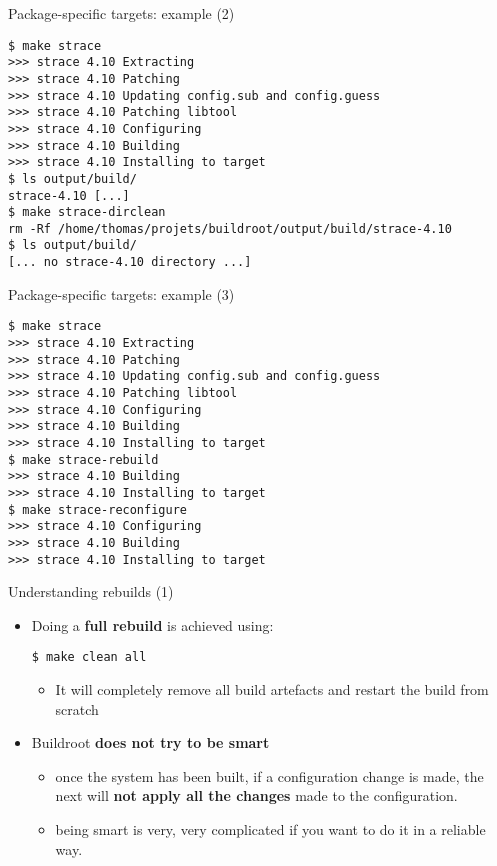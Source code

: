 \begin{frame}[fragile]{Package-specific targets: example (2)}

\begin{block}{}
{\tiny
\begin{verbatim}
$ make strace
>>> strace 4.10 Extracting
>>> strace 4.10 Patching
>>> strace 4.10 Updating config.sub and config.guess
>>> strace 4.10 Patching libtool
>>> strace 4.10 Configuring
>>> strace 4.10 Building
>>> strace 4.10 Installing to target
$ ls output/build/
strace-4.10 [...]
$ make strace-dirclean
rm -Rf /home/thomas/projets/buildroot/output/build/strace-4.10
$ ls output/build/
[... no strace-4.10 directory ...]
\end{verbatim}}
\end{block}

\end{frame}

\begin{frame}[fragile]{Package-specific targets: example (3)}

\begin{block}{}
{\tiny
\begin{verbatim}
$ make strace
>>> strace 4.10 Extracting
>>> strace 4.10 Patching
>>> strace 4.10 Updating config.sub and config.guess
>>> strace 4.10 Patching libtool
>>> strace 4.10 Configuring
>>> strace 4.10 Building
>>> strace 4.10 Installing to target
$ make strace-rebuild
>>> strace 4.10 Building
>>> strace 4.10 Installing to target
$ make strace-reconfigure
>>> strace 4.10 Configuring
>>> strace 4.10 Building
>>> strace 4.10 Installing to target
\end{verbatim}}
\end{block}

\end{frame}

\begin{frame}[fragile]{Understanding rebuilds (1)}
  \begin{itemize}
  \item Doing a {\bf full rebuild} is achieved using:
    \begin{block}{}
\begin{verbatim}
$ make clean all
\end{verbatim}
\end{block}
\begin{itemize}
\item It will completely remove all build artefacts and restart the
  build from scratch
\end{itemize}
  \item Buildroot {\bf does not try to be smart}
    \begin{itemize}
    \item once the system has been built, if a configuration change is
      made, the next  will {\bf not apply all the changes}
      made to the configuration.
    \item being smart is very, very complicated if you want to do it
      in a reliable way.
    \end{itemize}
  \end{itemize}
\end{frame}


